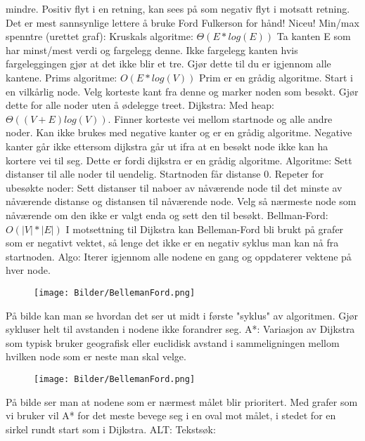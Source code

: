 \documentclass[10pt,a4paper]{article}
\begin{document}
\begin{multicols}{4}
{mindre. Positiv flyt i en retning, kan sees på som negativ flyt i motsatt retning. Det er mest sannsynlige lettere å bruke Ford Fulkerson for hånd! Niceu!
\noindent
\color{red} Min/max spenntre (urettet graf): \color{black} \color{orange} Kruskals algoritme: \color{black} $\Theta(E*log(E))$ Ta kanten E som har minst/mest verdi og fargelegg denne. Ikke fargelegg kanten hvis fargeleggingen gjør at det ikke blir et tre. Gjør dette til du er igjennom alle kantene. \color{orange} Prims algoritme: \color{black} $O(E*log(V))$ Prim er en grådig algoritme. Start i en vilkårlig node. Velg korteste kant fra denne og marker noden som besøkt. Gjør dette for alle noder uten å ødelegge treet.
\color{red} Dijkstra: \color{black} Med heap: $\Theta((V+E)log(V))$. Finner korteste vei mellom startnode og alle andre noder. Kan ikke brukes med negative kanter og er en grådig algoritme. Negative kanter går ikke ettersom dijkstra går ut ifra at en besøkt node ikke kan ha kortere vei til seg. Dette er fordi dijkstra er en grådig algoritme. Algoritme: Sett distanser til alle noder til uendelig. Startnoden får distanse 0. Repeter for ubesøkte noder: Sett distanser til naboer av nåværende node til det minste av nåværende distanse og distansen til nåværende node. Velg så nærmeste node som nåværende om den ikke er valgt enda og sett den til besøkt. 
\color{red} Bellman-Ford: \color{black} $O(|V|*|E|)$ I motsettning til Dijkstra kan Belleman-Ford bli brukt på grafer som er negativt vektet, så lenge det ikke er en negativ syklus man kan nå fra startnoden. Algo: Iterer igjennom alle nodene en gang og oppdaterer vektene på hver node.
\begin{figure}[H]
    \texttt{[image: Bilder/BellemanFord.png]}
\end{figure}
På bilde kan man se hvordan det ser ut midt i første "syklus" av algoritmen. Gjør sykluser helt til avstanden i nodene ikke forandrer seg.
\color{red} A*: \color{black} Variasjon av Dijkstra som typisk bruker geografisk eller euclidisk avstand i sammeligningen mellom hvilken node som er neste man skal velge. \begin{figure}[H]
    \texttt{[image: Bilder/BellemanFord.png]}
\end{figure}
På bilde ser man at nodene som er nærmest målet blir prioritert. Med grafer som vi bruker vil A* for det meste bevege seg i en oval mot målet, i stedet for en sirkel rundt start som i Dijkstra. 
\color{red} ALT: \color{black}
\noindent
\color{red}Tekstsøk: \color{black}
}
\end{multicols}
\end{document}
